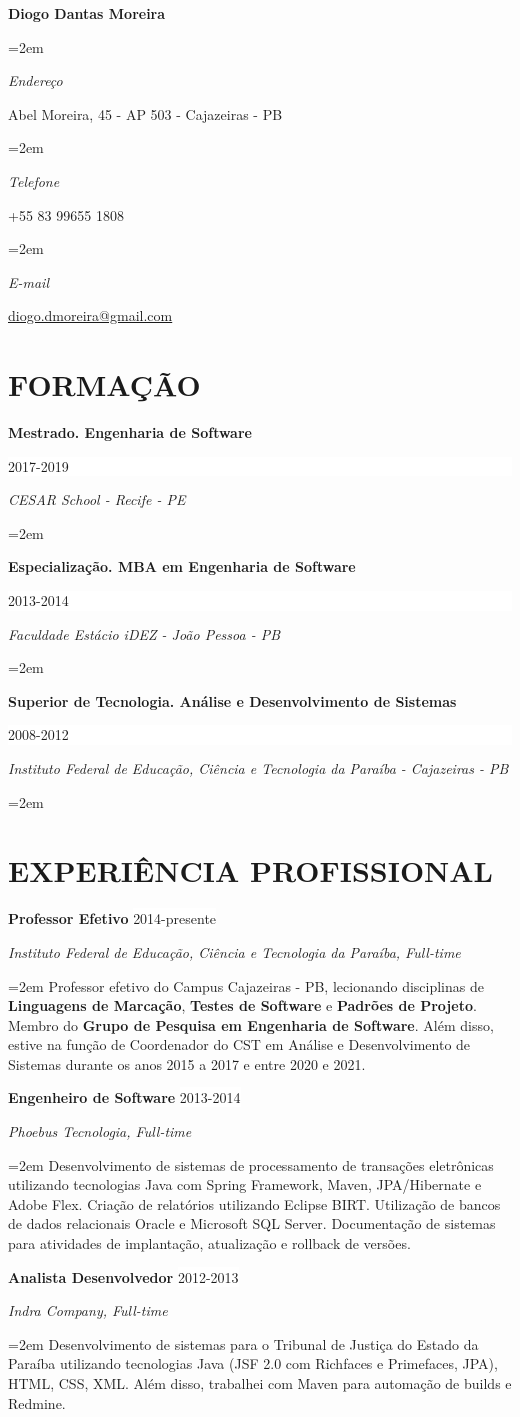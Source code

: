 \documentclass[paper=a4,fontsize=12pt]{article}
\newlength{\spacebox}
\newcommand{\sepspace}{\vspace*{,8em}}
\newcommand{\Name}[1]{ 
	\Huge
	\noindent\textbf{#1} \par \normalsize \normalfont
}
\newcommand{\NewPart}[1]{ \section*{\large \uppercase{#1}}}
\newcommand{\PersonalEntry}[2]{
	\noindent\hangindent=2em\hangafter=0 		%
	\parbox{\spacebox}{							%
		\textit{#1}}								%
	\hspace{1.5em} #2 \par}						%
\newcommand{\EducationEntry}[4]{
	\noindent \textbf{#1} \hfill 					%
	\colorbox{White}{%
		\parbox{6em}{%
			\hfill\color{Black}#2}} \par				%
	\noindent \textit{#3} \par						%
	\noindent\hangindent=2em\hangafter=0 \small #4 	%
	\normalsize \par}
\newcommand{\WorkEntry}[4]{								%
	\noindent \textbf{#1} \hfill 					%
	\colorbox{White}{\color{Black}#2} \par			%
	\noindent \textit{#3} \par						%
	\noindent\hangindent=2em\hangafter=0 \small #4 	%
	\normalsize \par}
\begin{document}
	
	\Name{Diogo Dantas Moreira}
	
	
	\sepspace
	
	\PersonalEntry{Endereço}{Abel Moreira, 45 - AP 503 - Cajazeiras - PB}
	\PersonalEntry{Telefone}{+55 83 99655 1808}
	\PersonalEntry{E-mail}{\url{diogo.dmoreira@gmail.com}}
	
	\NewPart{Formação}{} 
	\EducationEntry{Mestrado. Engenharia de Software}{2017-2019}{CESAR School - Recife - PE}{}
	\EducationEntry{Especialização. MBA em Engenharia de Software}{2013-2014}{Faculdade Estácio iDEZ - João Pessoa - PB}{}
	\EducationEntry{Superior de Tecnologia. Análise e Desenvolvimento de Sistemas}{2008-2012}{Instituto Federal de Educação, Ciência e Tecnologia da Paraíba - Cajazeiras - PB}{}
	
	\NewPart{Experiência Profissional}{}
	
	
	\WorkEntry{Professor Efetivo}{2014-presente}{Instituto Federal de Educação, Ciência e Tecnologia da Paraíba, Full-time}{Professor efetivo do Campus Cajazeiras - PB, lecionando disciplinas de \textbf{Linguagens de Marcação}, \textbf{Testes de Software} e \textbf{Padrões de Projeto}. Membro do \textbf{Grupo de Pesquisa em Engenharia de Software}. Além disso, estive na função de Coordenador do CST em Análise e Desenvolvimento de Sistemas durante os anos 2015 a 2017 e entre 2020 e 2021.}
	\sepspace
	
	\WorkEntry{Engenheiro de Software}{2013-2014}{Phoebus Tecnologia, Full-time}{Desenvolvimento de sistemas de processamento de transações eletrônicas utilizando tecnologias Java com Spring Framework, Maven, JPA/Hibernate e Adobe Flex. Criação de relatórios utilizando Eclipse BIRT. Utilização de bancos de dados relacionais Oracle e Microsoft SQL Server. Documentação de sistemas para atividades de implantação, atualização e rollback de versões.}
	\sepspace
	
	\WorkEntry{Analista Desenvolvedor}{2012-2013}{Indra Company, Full-time}{Desenvolvimento de sistemas para o Tribunal de Justiça do Estado da Paraíba utilizando tecnologias Java (JSF 2.0 com Richfaces e Primefaces, JPA), HTML, CSS, XML. Além disso, trabalhei com Maven para automação de builds e Redmine.}
	\sepspace
	
\end{document}
